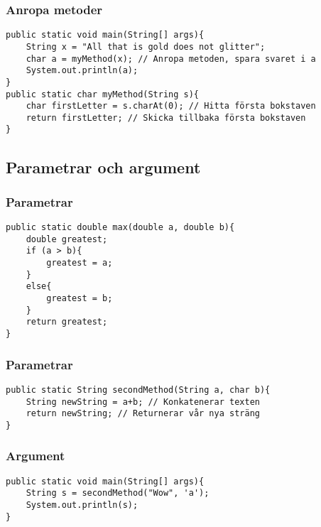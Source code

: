 \documentclass[aspectratio=169]{beamer}
\begin{document}
\begin{frame}[fragile]
    \frametitle{Anropa metoder}

    \begin{lstlisting}
public static void main(String[] args){
    String x = "All that is gold does not glitter";
    char a = myMethod(x); // Anropa metoden, spara svaret i a
    System.out.println(a);
}
public static char myMethod(String s){
    char firstLetter = s.charAt(0); // Hitta första bokstaven
    return firstLetter; // Skicka tillbaka första bokstaven
}
    \end{lstlisting}

\end{frame}

\subsection{Parametrar och argument}

\begin{frame}[fragile]
    \frametitle{Parametrar}


    \begin{lstlisting}
public static double max(double a, double b){
    double greatest;
    if (a > b){
        greatest = a;
    }
    else{
        greatest = b;
    }
    return greatest;
}
    \end{lstlisting}

\end{frame}

\begin{frame}[fragile]
    \frametitle{Parametrar}


    \begin{lstlisting}
public static String secondMethod(String a, char b){
    String newString = a+b; // Konkatenerar texten
    return newString; // Returnerar vår nya sträng
}
    \end{lstlisting}

\end{frame}

\begin{frame}[fragile]
    \frametitle{Argument}


    \begin{lstlisting}
public static void main(String[] args){
    String s = secondMethod("Wow", 'a');
    System.out.println(s);
}
    \end{lstlisting}



\end{frame}
\end{document}
